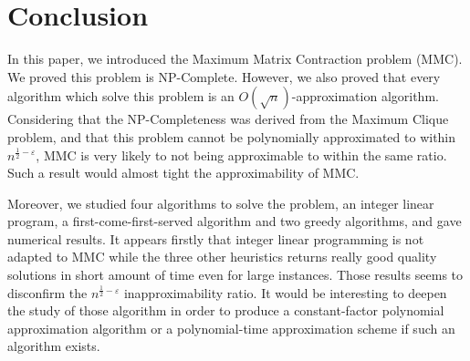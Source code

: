 \section{Conclusion}

In this paper, we introduced the Maximum Matrix Contraction problem (MMC). 
We proved this problem is NP-Complete. However, we also proved that every algorithm which solve this problem is an $O(\sqrt{n})$-approximation algorithm. Considering that the NP-Completeness was derived from the Maximum Clique problem, and that this problem cannot be polynomially approximated to within $n^{\frac{1}{2}-\varepsilon}$, MMC is very likely to not being approximable to within the same ratio. Such a result would almost tight the approximability of MMC.

Moreover, we studied four algorithms to solve the problem, an integer linear program, a first-come-first-served algorithm and two greedy algorithms, and gave numerical results. It appears firstly that integer linear programming is not adapted to MMC while the three other heuristics returns really good quality solutions in short amount of time even for large instances. Those results seems to disconfirm the $n^{\frac{1}{2}-\varepsilon}$ inapproximability ratio. It would be interesting to deepen the study of those algorithm in order to produce a constant-factor polynomial approximation algorithm or a polynomial-time approximation scheme if such an algorithm exists.
